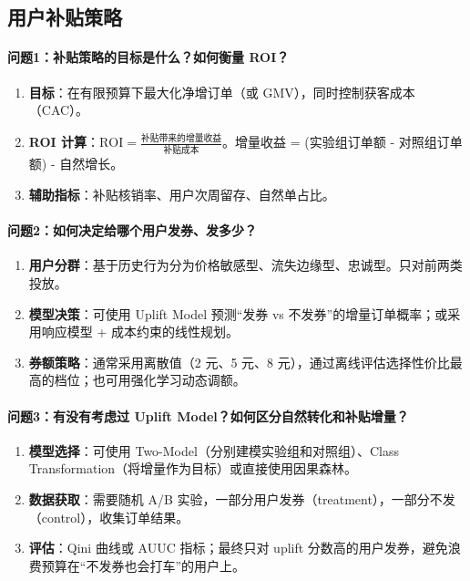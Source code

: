 \documentclass[12pt,a4paper]{article}
\begin{document}
\subsection{用户补贴策略}

\paragraph{问题1：补贴策略的目标是什么？如何衡量 ROI？}
\begin{enumerate}[label=(\arabic*)]
\item \textbf{目标}：在有限预算下最大化净增订单（或 GMV），同时控制获客成本（CAC）。
\item \textbf{ROI 计算}：$\text{ROI} = \frac{\text{补贴带来的增量收益}}{\text{补贴成本}}$。增量收益 = (实验组订单额 - 对照组订单额) - 自然增长。
\item \textbf{辅助指标}：补贴核销率、用户次周留存、自然单占比。
\end{enumerate}

\paragraph{问题2：如何决定给哪个用户发券、发多少？}
\begin{enumerate}[label=(\arabic*)]
\item \textbf{用户分群}：基于历史行为分为价格敏感型、流失边缘型、忠诚型。只对前两类投放。
\item \textbf{模型决策}：可使用 Uplift Model 预测“发券 vs 不发券”的增量订单概率；或采用响应模型 + 成本约束的线性规划。
\item \textbf{券额策略}：通常采用离散值（2 元、5 元、8 元），通过离线评估选择性价比最高的档位；也可用强化学习动态调额。
\end{enumerate}

\paragraph{问题3：有没有考虑过 Uplift Model？如何区分自然转化和补贴增量？}
\begin{enumerate}[label=(\arabic*)]
\item \textbf{模型选择}：可使用 Two-Model（分别建模实验组和对照组）、Class Transformation（将增量作为目标）或直接使用因果森林。
\item \textbf{数据获取}：需要随机 A/B 实验，一部分用户发券（treatment），一部分不发（control），收集订单结果。
\item \textbf{评估}：Qini 曲线或 AUUC 指标；最终只对 uplift 分数高的用户发券，避免浪费预算在“不发券也会打车”的用户上。
\end{enumerate}
\end{document}
